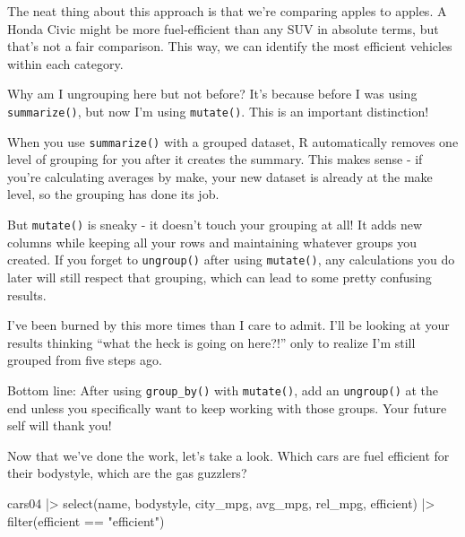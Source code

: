 \documentclass[
  letterpaper,
]{book}
\newenvironment{Shaded}{\begin{snugshade}}{\end{snugshade}}
\newcommand{\FunctionTok}[1]{\textcolor[rgb]{0.28,0.35,0.67}{#1}}
\newcommand{\NormalTok}[1]{\textcolor[rgb]{0.00,0.23,0.31}{#1}}
\newcommand{\SpecialCharTok}[1]{\textcolor[rgb]{0.37,0.37,0.37}{#1}}
\newcommand{\StringTok}[1]{\textcolor[rgb]{0.13,0.47,0.30}{#1}}
\begin{document}
The neat thing about this approach is that we're comparing apples to
apples. A Honda Civic might be more fuel-efficient than any SUV in
absolute terms, but that's not a fair comparison. This way, we can
identify the most efficient vehicles within each category.

\begin{tcolorbox}[enhanced jigsaw, colframe=quarto-callout-tip-color-frame, breakable, arc=.35mm, bottomtitle=1mm, bottomrule=.15mm, colbacktitle=quarto-callout-tip-color!10!white, rightrule=.15mm, colback=white, opacityback=0, opacitybacktitle=0.6, coltitle=black, left=2mm, toptitle=1mm, toprule=.15mm, titlerule=0mm, leftrule=.75mm, title=\textcolor{quarto-callout-tip-color}{\faLightbulb}\hspace{0.5em}{Tip from the Helpdesk: The Danger of Groupthink}]

Why am I ungrouping here but not before? It's because before I was using
\texttt{summarize()}, but now I'm using \texttt{mutate()}. This is an
important distinction!

When you use \texttt{summarize()} with a grouped dataset, R
automatically removes one level of grouping for you after it creates the
summary. This makes sense - if you're calculating averages by make, your
new dataset is already at the make level, so the grouping has done its
job.

But \texttt{mutate()} is sneaky - it doesn't touch your grouping at all!
It adds new columns while keeping all your rows and maintaining whatever
groups you created. If you forget to \texttt{ungroup()} after using
\texttt{mutate()}, any calculations you do later will still respect that
grouping, which can lead to some pretty confusing results.

I've been burned by this more times than I care to admit. I'll be
looking at your results thinking ``what the heck is going on here?!''
only to realize I'm still grouped from five steps ago.

Bottom line: After using \texttt{group\_by()} with \texttt{mutate()},
add an \texttt{ungroup()} at the end unless you specifically want to
keep working with those groups. Your future self will thank you!

\end{tcolorbox}

Now that we've done the work, let's take a look. Which cars are fuel
efficient for their bodystyle, which are the gas guzzlers?

\begin{Shaded}
\begin{Highlighting}[]
\NormalTok{cars04 }\SpecialCharTok{|\textgreater{}} 
  \FunctionTok{select}\NormalTok{(name, bodystyle, city\_mpg, avg\_mpg, rel\_mpg, efficient) }\SpecialCharTok{|\textgreater{}} 
  \FunctionTok{filter}\NormalTok{(efficient }\SpecialCharTok{==} \StringTok{"efficient"}\NormalTok{)}
\end{Highlighting}
\end{Shaded}
\end{document}

